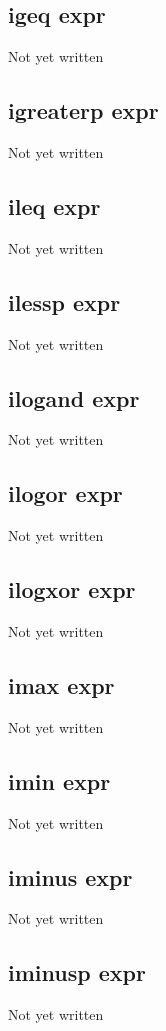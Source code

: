 \documentclass[a4paper,11pt]{article}
\begin{document}
{\subsection{\ttfamily igeq expr}
Not yet written

\subsection{\ttfamily igreaterp expr}
Not yet written

\subsection{\ttfamily ileq expr}
Not yet written

\subsection{\ttfamily ilessp expr}
Not yet written

\subsection{\ttfamily ilogand expr}
Not yet written

\subsection{\ttfamily ilogor expr}
Not yet written

\subsection{\ttfamily ilogxor expr}
Not yet written

\subsection{\ttfamily imax expr}
Not yet written

\subsection{\ttfamily imin expr}
Not yet written

\subsection{\ttfamily iminus expr}
Not yet written

\subsection{\ttfamily iminusp expr}
Not yet written

}
\end{document}
